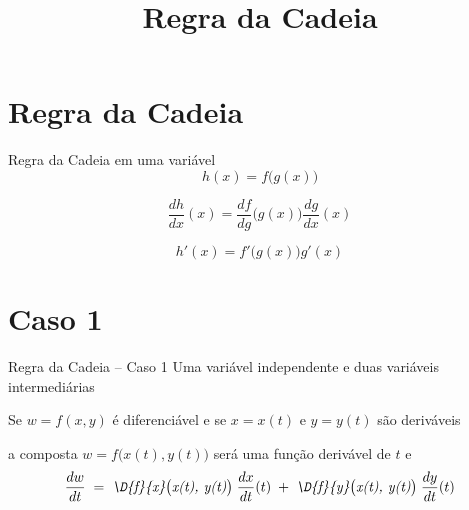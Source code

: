 
\usepackage{calculo_varias_variaveis-1}

\title{Regra da Cadeia}



\addtitle

\section{Regra da Cadeia}

\begin{frame}{Regra da Cadeia em uma variável}
    \[
        h(x) = f\big(g(x)\big)
    \]

    \pause
    \vspace{\baselineskip}
    \[
        \frac{dh}{dx}(x) = \frac{df}{dg}\big(g(x)\big)\frac{dg}{dx}(x)
    \]

    \pause
    \vspace{\baselineskip}
    \[
        h'(x) = f'\big(g(x)\big) g'(x)
    \]
\end{frame}

\section{Caso 1}

\begin{frame}{Regra da Cadeia -- Caso 1}
    Uma variável independente e duas variáveis intermediárias
    \vspace{\baselineskip}

    \pause
    Se \(w=f(x, y)\) é diferenciável
    \pause
    e se \(x=x(t)\) e \(y=y(t)\) são deriváveis

    \pause
    \vspace{.5\baselineskip}
    a composta \(w=f\big(x(t), y(t)\big)\) será uma função derivável de $t$ e
    \pause
    \[
        \frac{dw}{dt}
        \;=\; \emph{\D{f}{x}\big(x(t), y(t)\big)}\; \frac{dx}{dt}(t)
        \;+\; \emph{\D{f}{y}\big(x(t), y(t)\big)}\; \frac{dy}{dt}(t)
    \]
\end{frame}

